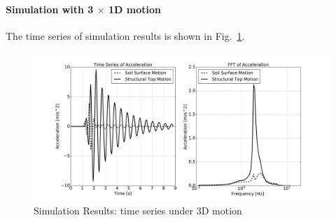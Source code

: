 \paragraph{Simulation with 3 $\times$ 1D motion }
The time series of simulation results is shown in Fig.~\ref{fig_decon_3D_motion_1D_model_results_top_bottom_time_series_ssi3d_3D_motion}.
\begin{figure}[H]
  \centering
  \includegraphics[width = 15cm]{./Figure-files/nonlinear_analysis_steps/soil-structure-3D-ans/shell_structure_motion_node_38_x_acce_compare.pdf}
  \caption{Simulation Results: time series under 3D motion}
  \label{fig_decon_3D_motion_1D_model_results_top_bottom_time_series_ssi3d_3D_motion}
\end{figure}

